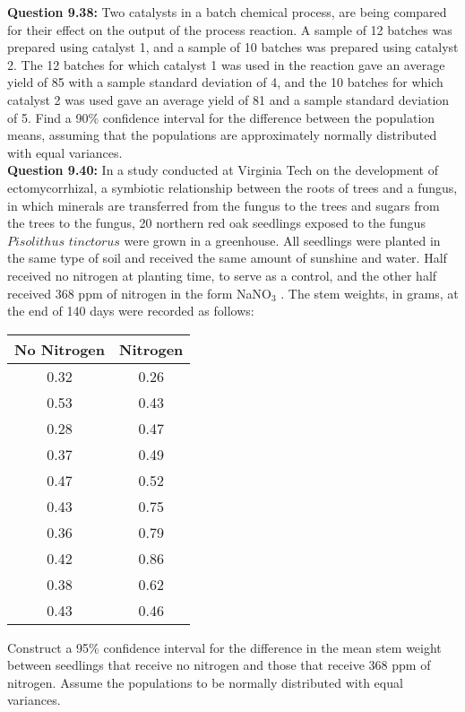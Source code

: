 \documentclass{article}
\begin{document}
\textbf{Question 9.38:}
Two catalysts in a batch chemical process, are
being compared for their effect on the output of the
process reaction. A sample of 12 batches was prepared
using catalyst 1, and a sample of 10 batches was 
prepared using catalyst 2. The 12 batches for which 
catalyst 1 was used in the reaction gave an average yield
of 85 with a sample standard deviation of 4, and the
10 batches for which catalyst 2 was used gave an average 
yield of 81 and a sample standard deviation of 5.
Find a 90\% confidence interval for the difference 
between the population means, assuming that the 
populations are approximately normally distributed with
equal variances.\\\newline
\textbf{Question 9.40:}
In a study conducted at Virginia Tech on the
development of ectomycorrhizal, a symbiotic relationship 
between the roots of trees and a fungus, in which
minerals are transferred from the fungus to the trees
and sugars from the trees to the fungus, 20 northern
red oak seedlings exposed to the fungus $Pisolithus$ $tinctorus$ 
were grown in a greenhouse. All seedlings were planted in 
the same type of soil and received the same amount of 
sunshine and water. Half received no nitrogen at planting 
time, to serve as a control, and the other half received 
368 ppm of nitrogen in the form NaNO$_3$ . The stem weights, 
in grams, at the end of 140 days were recorded as follows:
\begin{center}
\begin{tabular}{ c  c }
    No Nitrogen & Nitrogen\\
    \hline
    0.32 & 0.26 \\ 
    0.53 & 0.43 \\
    0.28 & 0.47 \\
    0.37 & 0.49 \\
    0.47 & 0.52 \\
    0.43 & 0.75 \\
    0.36 & 0.79 \\
    0.42 & 0.86 \\
    0.38 & 0.62 \\
    0.43 & 0.46 \\
    \hline
\end{tabular}
\end{center}
Construct a 95\% confidence interval for the difference
in the mean stem weight between seedlings that receive 
no nitrogen and those that receive 368 ppm of nitrogen. 
Assume the populations to be normally distributed with 
equal variances.\\\newline
\end{document}
